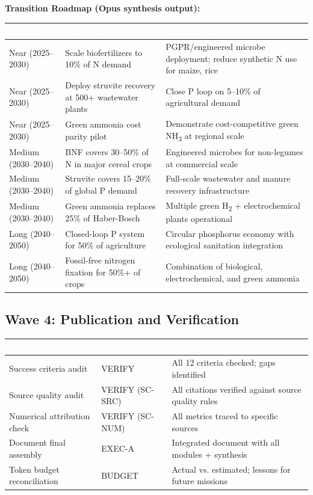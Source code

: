 \documentclass[11pt,letterpaper]{article}
\newcommand{\tableheader}[1]{\textbf{\sffamily\textcolor{white}{#1}}}
\begin{document}
\textbf{Transition Roadmap (Opus synthesis output):}

\begin{center}
\begin{tabularx}{\textwidth}{L{2.5cm}L{4cm}X}
\toprule
{}
\tableheader{Horizon} & \tableheader{Milestone} & \tableheader{Description} \\
\midrule
Near (2025--2030) & Scale biofertilizers to 10\% of N demand & PGPR/engineered microbe deployment; reduce synthetic N use for maize, rice \\
Near (2025--2030) & Deploy struvite recovery at 500+ wastewater plants & Close P loop on 5--10\% of agricultural demand \\
Near (2025--2030) & Green ammonia cost parity pilot & Demonstrate cost-competitive green NH\textsubscript{3} at regional scale \\
Medium (2030--2040) & BNF covers 30--50\% of N in major cereal crops & Engineered microbes for non-legumes at commercial scale \\
Medium (2030--2040) & Struvite covers 15--20\% of global P demand & Full-scale wastewater and manure recovery infrastructure \\
Medium (2030--2040) & Green ammonia replaces 25\% of Haber-Bosch & Multiple green H\textsubscript{2} + electrochemical plants operational \\
Long (2040--2050) & Closed-loop P system for 50\% of agriculture & Circular phosphorus economy with ecological sanitation integration \\
Long (2040--2050) & Fossil-free nitrogen fixation for 50\%+ of crops & Combination of biological, electrochemical, and green ammonia \\
\bottomrule
\end{tabularx}
\end{center}

\subsection{Wave 4: Publication and Verification}

\begin{center}
\begin{tabularx}{\textwidth}{L{3cm}L{2.5cm}X}
\toprule
{}
\tableheader{Task} & \tableheader{Agent} & \tableheader{Output} \\
\midrule
Success criteria audit & VERIFY & All 12 criteria checked; gaps identified \\
Source quality audit & VERIFY (SC-SRC) & All citations verified against source quality rules \\
Numerical attribution check & VERIFY (SC-NUM) & All metrics traced to specific sources \\
Document final assembly & EXEC-A & Integrated document with all modules + synthesis \\
Token budget reconciliation & BUDGET & Actual vs. estimated; lessons for future missions \\
\bottomrule
\end{tabularx}
\end{center}
\end{document}
